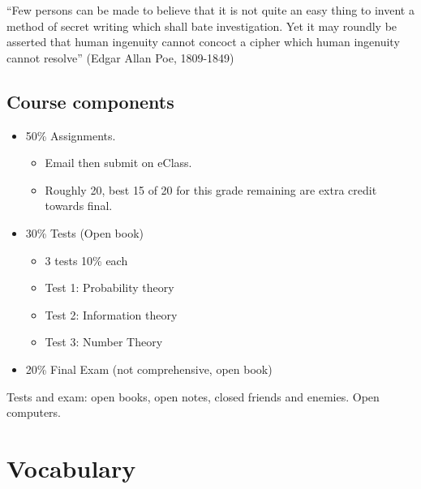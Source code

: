 \documentclass[11pt]{amsart}
\theoremstyle{definition}\newtheorem{definition}{Definition}
\theoremstyle{definition}\newtheorem{example}{Example}
\begin{document}
``Few persons can be made to believe that it is not quite an easy thing to invent a method of secret writing which shall bate investigation. Yet it may roundly be asserted that human ingenuity cannot concoct a cipher which human ingenuity cannot resolve'' (Edgar Allan Poe, 1809-1849)

\subsection{Course components}

\begin{itemize}
    \item 50\% Assignments.
    \begin{itemize}
        \item Email then submit on eClass.
        \item Roughly 20, best 15 of 20 for this grade remaining are extra credit towards final.
    \end{itemize}
    \item 30\% Tests (Open book)
    \begin{itemize}
        \item 3 tests 10\% each
        \item Test 1: Probability theory
        \item Test 2: Information theory
        \item Test 3: Number Theory
    \end{itemize}
    \item 20\% Final Exam (not comprehensive, open book)
\end{itemize}
Tests and exam: open books, open notes, closed friends and enemies. Open computers.

\section{Vocabulary}
\end{document}
